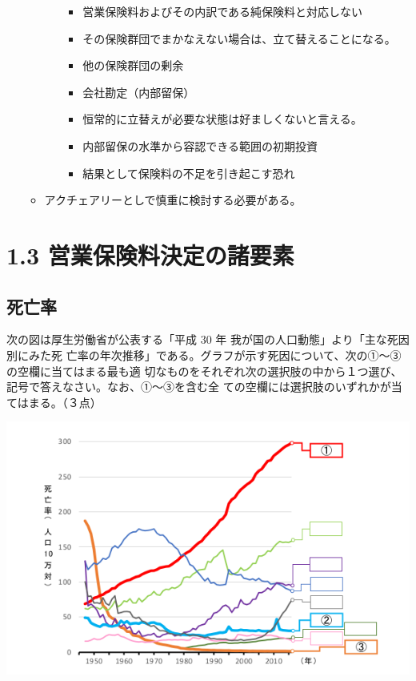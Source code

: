 \documentclass[report,gutter=10mm,fore-edge=10mm,uplatex,dvipdfmx]{jlreq}
\begin{document}
\begin{itemize}
\begin{itemize}
\begin{itemize}
\begin{itemize}
          \item
            営業保険料およびその内訳である純保険料と対応しない
          \item
            その保険群団でまかなえない場合は、立て替えることになる。

                \item
              他の保険群団の剰余
            \item
              会社勘定（内部留保）
              \item
            恒常的に立替えが必要な状態は好ましくないと言える。
          \item
            内部留保の水準から容認できる範囲の初期投資
          \item
            結果として保険料の不足を引き起こす恐れ
          
        \end{itemize}
      \end{itemize}
    \item
      アクチェアリーとしで慎重に検討する必要がある。
    
  \end{itemize}
\end{itemize}

\section{1.3 営業保険料決定の諸要素}
\subsection{死亡率}

次の図は厚生労働省が公表する「平成 30 年 我が国の人口動態」より「主な死因別にみた死
亡率の年次推移」である。グラフが示す死因について、次の①～③の空欄に当てはまる最も適
切なものをそれぞれ次の選択肢の中から１つ選び、記号で答えなさい。なお、①～③を含む全
ての空欄には選択肢のいずれかが当てはまる。（３点）

       \includegraphics[scale=1]{images/Prob2022-1-1-6-a.png}
\end{document}
